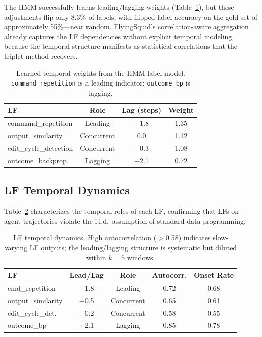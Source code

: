 \documentclass[11pt,a4paper]{article}
\begin{document}
The HMM successfully learns leading/lagging weights (Table~\ref{tab:temporal-weights}), but these adjustments flip only 8.3\% of labels, with flipped-label accuracy on the gold set of approximately 55\%---near random. FlyingSquid's correlation-aware aggregation already captures the LF dependencies without explicit temporal modeling, because the temporal structure manifests as statistical correlations that the triplet method recovers.

\begin{table}[t]
\centering
\small
\begin{tabular}{lccc}
\toprule
\textbf{LF} & \textbf{Role} & \textbf{Lag (steps)} & \textbf{Weight} \\
\midrule
command\_repetition & Leading & $-$1.8 & 1.35 \\
output\_similarity & Concurrent & 0.0 & 1.12 \\
edit\_cycle\_detection & Concurrent & $-$0.3 & 1.08 \\
outcome\_backprop. & Lagging & +2.1 & 0.72 \\
\bottomrule
\end{tabular}
\caption{Learned temporal weights from the HMM label model. \texttt{command\_repetition} is a leading indicator; \texttt{outcome\_bp} is lagging.}
\label{tab:temporal-weights}
\end{table}

\subsection{LF Temporal Dynamics}
\label{sec:lf-dynamics}

Table~\ref{tab:lf-temporal} characterizes the temporal roles of each LF, confirming that LFs on agent trajectories violate the i.i.d.\ assumption of standard data programming.

\begin{table}[t]
\centering
\small
\begin{tabular}{lcccc}
\toprule
\textbf{LF} & \textbf{Lead/Lag} & \textbf{Role} & \textbf{Autocorr.} & \textbf{Onset Rate} \\
\midrule
cmd\_repetition & $-$1.8 & Leading & 0.72 & 0.68 \\
output\_similarity & $-$0.5 & Concurrent & 0.65 & 0.61 \\
edit\_cycle\_det. & $-$0.2 & Concurrent & 0.58 & 0.55 \\
outcome\_bp & +2.1 & Lagging & 0.85 & 0.78 \\
\bottomrule
\end{tabular}
\caption{LF temporal dynamics. High autocorrelation ($>$0.58) indicates slow-varying LF outputs; the leading/lagging structure is systematic but diluted within $k{=}5$ windows.}
\label{tab:lf-temporal}
\end{table}
\end{document}
